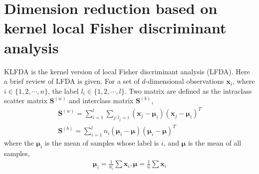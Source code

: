 \documentclass[conference,compsoc]{IEEEtran}
\begin{document}
\section{Dimension reduction based on kernel local Fisher discriminant analysis }

KLFDA is the kernel version of local Fisher discriminant analysis (LFDA). Here a brief review of LFDA is given. For a set of $d$-dimensional observations $\bm{x}_i$, where $i\in\{1,2,\cdots,n\}$, the label $l_i\in\{1,2,\cdots,l\}$. Two matrix are defined as the intraclass scatter matrix $\bm{S}^{(w)}$ and interclass matrix
$\bm{S}^{(b)}$, 
\begin{equation}
\begin{aligned}
\bm{S}^{(w)} = \mathop{\sum} _{i=1}^l\mathop{\sum}_{j:l_j = i} (\bm{x}_j - \bm{\mu}_i)(\bm{x}_j - \bm{\mu}_i)^T \\
\bm{S}^{(b)} = \mathop{\sum} _{i=1}^l n_i(\bm{\mu}_i - \bm{\mu})(\bm{\mu}_i - \bm{\mu})^T
\end{aligned}
\end{equation}
where the $\bm{\mu}_i$ is the mean of samples whose label is $i$, and $\bm{\mu}$ is the mean of all samples,
\begin{equation}
\begin{aligned}
\bm{\mu}_i = \frac{1}{n_i} \sum \bm{x}_i, 
\bm{\mu} = \frac{1}{n} \sum \bm{x}_i
\end{aligned}
\end{equation}
\end{document}
